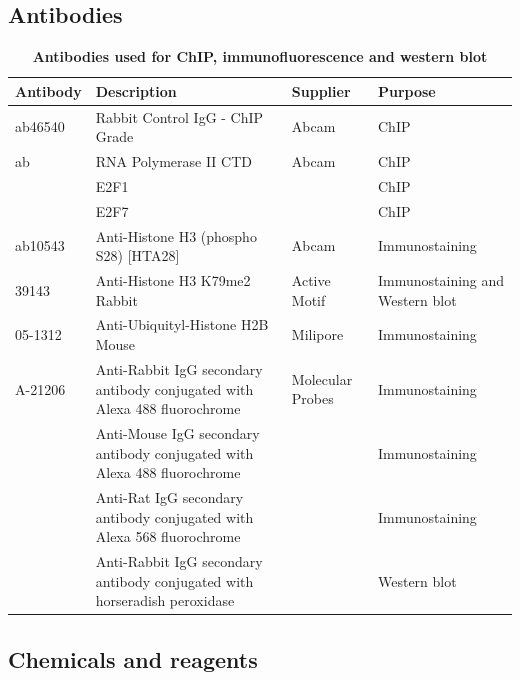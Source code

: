 \documentclass[11pt,twoside,a4paper]{report}
\begin{document}
		\subsection{Antibodies}
			\begin{table}[H]
       		\caption{\bf{Antibodies used for ChIP, immunofluorescence and western blot}}
        		\begin{center}
            		\begin{tabular}{p{2cm} | p{8cm} | p{3cm} | p{3cm}}
	                	\textbf{Antibody} & \textbf{Description} & \textbf{Supplier} & \textbf{Purpose}\\
    		            \hline
        		        ab46540 & Rabbit Control IgG - ChIP Grade & Abcam & ChIP\\
            		    ab & RNA Polymerase II CTD & Abcam & ChIP\\
            		     & E2F1 & & ChIP\\
						 & E2F7 & & ChIP\\
            		    ab10543 & Anti-Histone H3 (phospho S28) [HTA28] & Abcam & Immunostaining\\
            		    39143  & Anti-Histone H3 K79me2 Rabbit & Active Motif & Immunostaining and Western blot\\
            		    05-1312  &  Anti-Ubiquityl-Histone H2B Mouse & Milipore & Immunostaining\\
            		    \hline
            		    A-21206 & Anti-Rabbit IgG secondary antibody conjugated with Alexa 488 fluorochrome &  Molecular Probes & Immunostaining\\
               		    & Anti-Mouse IgG secondary antibody conjugated with Alexa 488  fluorochrome &  & Immunostaining\\
            		    & Anti-Rat IgG secondary antibody conjugated with Alexa 568 fluorochrome & & Immunostaining\\
            		    & Anti-Rabbit IgG secondary antibody conjugated with horseradish peroxidase &  & Western blot\\
	            	\end{tabular}
    		    \end{center}
		    \end{table}
		  
		\subsection{Chemicals and reagents}
		
\end{document}
